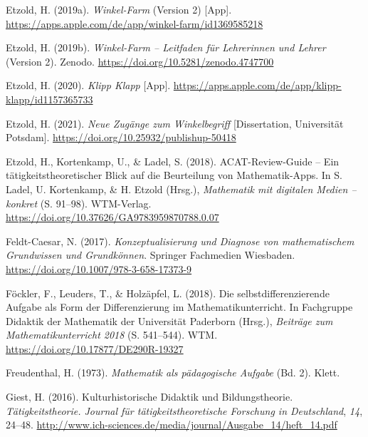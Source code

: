 \documentclass[
]{scrbook}
\newlength{\cslhangindent}
\newlength{\cslentryspacingunit} %
\newenvironment{CSLReferences}[2] %
 {%
  \setlength{\parindent}{0pt}
  \ifodd #1
  \let\oldpar\par
  \def\par{\hangindent=\cslhangindent\oldpar}
  \fi
  \setlength{\parskip}{#2\cslentryspacingunit}
 }%
 {}
\theoremstyle{definition}
\theoremstyle{definition}
\theoremstyle{definition}
\theoremstyle{definition}
\theoremstyle{remark}
\begin{document}
\begin{CSLReferences}{1}{0}
\leavevmode{}%
Etzold, H. (2019a). \emph{Winkel-{Farm}} (Version 2) {[}App{]}. \url{https://apps.apple.com/de/app/winkel-farm/id1369585218}

\leavevmode{}%
Etzold, H. (2019b). \emph{Winkel-{Farm} -- {Leitfaden} für {Lehrerinnen} und {Lehrer}} (Version 2). Zenodo. \url{https://doi.org/10.5281/zenodo.4747700}

\leavevmode{}%
Etzold, H. (2020). \emph{Klipp {Klapp}} {[}App{]}. \url{https://apps.apple.com/de/app/klipp-klapp/id1157365733}

\leavevmode{}%
Etzold, H. (2021). \emph{Neue Zugänge zum Winkelbegriff} {[}Dissertation, Universität Potsdam{]}. \url{https://doi.org/10.25932/publishup-50418}

\leavevmode{}%
Etzold, H., Kortenkamp, U., \& Ladel, S. (2018). {ACAT}-{Review}-{Guide} -- {Ein} tätigkeitstheoretischer {Blick} auf die {Beurteilung} von {Mathematik}-{Apps}. In S. Ladel, U. Kortenkamp, \& H. Etzold (Hrsg.), \emph{Mathematik mit digitalen {Medien} -- konkret} (S. 91--98). WTM-Verlag. \url{https://doi.org/10.37626/GA9783959870788.0.07}

\leavevmode{}%
Feldt-Caesar, N. (2017). \emph{Konzeptualisierung und {Diagnose} von mathematischem {Grundwissen} und {Grundkönnen}}. Springer Fachmedien Wiesbaden. \url{https://doi.org/10.1007/978-3-658-17373-9}

\leavevmode{}%
Föckler, F., Leuders, T., \& Holzäpfel, L. (2018). Die selbstdifferenzierende {Aufgabe} als {Form} der {Differenzierung} im {Mathematikunterricht}. In Fachgruppe Didaktik der Mathematik der Universität Paderborn (Hrsg.), \emph{Beiträge zum {Mathematikunterricht} 2018} (S. 541--544). WTM. \url{https://doi.org/10.17877/DE290R-19327}

\leavevmode{}%
Freudenthal, H. (1973). \emph{Mathematik als pädagogische {Aufgabe}} (Bd. 2). Klett.

\leavevmode{}%
Giest, H. (2016). Kulturhistorische {Didaktik} und {Bildungstheorie}. \emph{Tätigkeitstheorie. Journal für tätigkeitstheoretische Forschung in Deutschland}, \emph{14}, 24--48. \url{http://www.ich-sciences.de/media/journal/Ausgabe_14/heft_14.pdf}


\end{CSLReferences}
\end{document}
